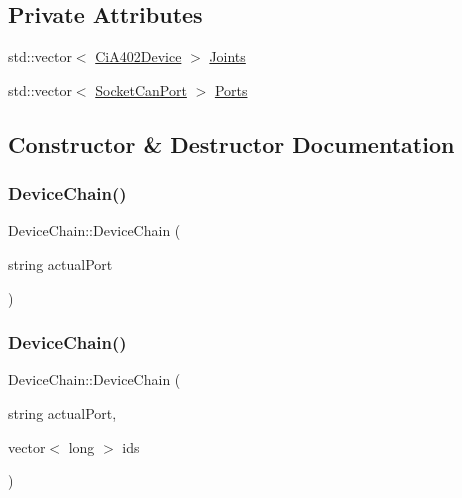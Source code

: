 \subsection*{Private Attributes}
\begin{DoxyCompactItemize}
\item 
std\+::vector$<$ \hyperlink{classCiA402Device}{Ci\+A402\+Device} $>$ \hyperlink{classDeviceChain_a114bea9dc1166ab2ea5a9ef7488c66ab}{Joints}
\item 
std\+::vector$<$ \hyperlink{classSocketCanPort}{Socket\+Can\+Port} $>$ \hyperlink{classDeviceChain_a760e12bf0095431fe76563cc5d7969de}{Ports}
\end{DoxyCompactItemize}


\subsection{Constructor \& Destructor Documentation}
\mbox{\label{classDeviceChain_ad89af127eec501ad00ad5f5de197b21e}} 
\subsubsection{\texorpdfstring{Device\+Chain()}{DeviceChain()}\hspace{0.1cm}{\footnotesize\ttfamily [1/2]}}
{\footnotesize\ttfamily Device\+Chain\+::\+Device\+Chain (\begin{DoxyParamCaption}\item[{string}]{actual\+Port }\end{DoxyParamCaption})}

\mbox{\label{classDeviceChain_a20dd5853f160cfc8ef21ed93dac96f11}} 
\subsubsection{\texorpdfstring{Device\+Chain()}{DeviceChain()}\hspace{0.1cm}{\footnotesize\ttfamily [2/2]}}
{\footnotesize\ttfamily Device\+Chain\+::\+Device\+Chain (\begin{DoxyParamCaption}\item[{string}]{actual\+Port,  }\item[{vector$<$ long $>$}]{ids }\end{DoxyParamCaption})}



